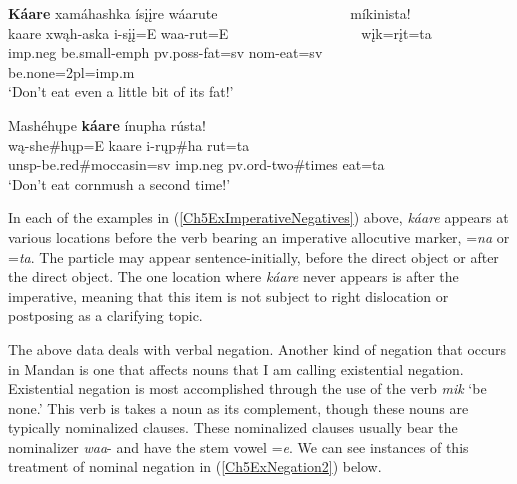 \begin{exe}
\begin{xlist}
    \item\label{Ch5ExImperativeNegativesF} \glll \textbf{Káare} xamáhashka ísįįre wáarute ~ ~ ~ ~ ~ ~ ~ ~ ~ ~ ~ míkinista!\\
    kaare xwąh-aska i-sįį=E waa-rut=E ~ ~ ~ ~ ~ ~ ~ ~ ~ ~ ~  wįk=rįt=ta\\
    imp.neg \textnormal{be.small}-emph pv.poss-\textnormal{fat}=sv nom-\textnormal{eat}=sv ~ ~ ~ ~ ~ ~ ~ ~ ~ ~ ~ \textnormal{be.none}=2pl=imp.m\\
    \glt `Don't eat even a little bit of its fat!' \citep[141]{hollow1973b}

    \item\label{Ch5ExImperativeNegativesG} \glll Mashéhųpe \textbf{káare} ínupha rústa!\\
    wą-she\#hųp=E kaare i-rųp\#ha rut=ta\\
    unsp-\textnormal{be.red}\#\textnormal{moccasin}=sv imp.neg pv.ord-\textnormal{two}\#\textnormal{times} \textnormal{eat}=ta\\
    \glt `Don't eat cornmush a second time!' \citep[176]{hollow1973b}
    
    \end{xlist}
    
\end{exe}

In each of the examples in (\ref{Ch5ExImperativeNegatives}) above, \textit{káare} appears at various locations before the verb bearing an imperative allocutive marker, =\textit{na} or =\textit{ta}. The particle may appear sentence-initially, before the direct object or after the direct object. The one location where \textit{káare} never appears is after the imperative, meaning that this item is not subject to right dislocation or postposing as a clarifying topic.

The above data deals with verbal negation. Another kind of negation that occurs in Mandan is one that affects nouns that I am calling existential negation. Existential negation is most accomplished through the use of the verb \textit{mik} `be none.' This verb is takes a noun as its complement, though these nouns are typically nominalized clauses. These nominalized clauses usually bear the nominalizer \textit{waa}- and have the stem vowel =\textit{e}. We can see instances of this treatment of nominal negation in (\ref{Ch5ExNegation2}) below.

